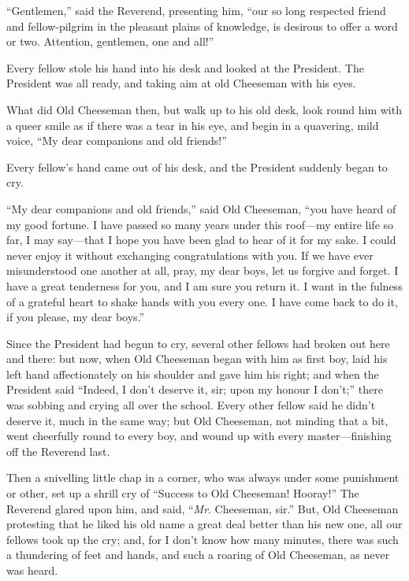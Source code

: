 ``Gentlemen,'' said the Reverend, presenting him, ``our so long
respected friend and fellow-pilgrim in the pleasant plains of
knowledge, is desirous to offer a word or two.  Attention,
gentlemen, one and all!''

Every fellow stole his hand into his desk and looked at the
President.  The President was all ready, and taking aim at old
Cheeseman with his eyes.

What did Old Cheeseman then, but walk up to his old desk, look round
him with a queer smile as if there was a tear in his eye, and begin
in a quavering, mild voice, ``My dear companions and old friends!''

Every fellow's hand came out of his desk, and the President suddenly
began to cry.

``My dear companions and old friends,'' said Old Cheeseman, ``you have
heard of my good fortune.  I have passed so many years under this
roof---my entire life so far, I may say---that I hope you have been
glad to hear of it for my sake.  I could never enjoy it without
exchanging congratulations with you.  If we have ever misunderstood
one another at all, pray, my dear boys, let us forgive and forget.
I have a great tenderness for you, and I am sure you return it.  I
want in the fulness of a grateful heart to shake hands with you
every one.  I have come back to do it, if you please, my dear boys.''

Since the President had begun to cry, several other fellows had
broken out here and there:  but now, when Old Cheeseman began with
him as first boy, laid his left hand affectionately on his shoulder
and gave him his right; and when the President said ``Indeed, I don't
deserve it, sir; upon my honour I don't;'' there was sobbing and
crying all over the school.  Every other fellow said he didn't
deserve it, much in the same way; but Old Cheeseman, not minding
that a bit, went cheerfully round to every boy, and wound up with
every master---finishing off the Reverend last.

Then a snivelling little chap in a corner, who was always under some
punishment or other, set up a shrill cry of ``Success to Old
Cheeseman!  Hooray!''  The Reverend glared upon him, and said, ``\emph{Mr}.
Cheeseman, sir.''  But, Old Cheeseman protesting that he liked his
old name a great deal better than his new one, all our fellows took
up the cry; and, for I don't know how many minutes, there was such a
thundering of feet and hands, and such a roaring of Old Cheeseman,
as never was heard.

